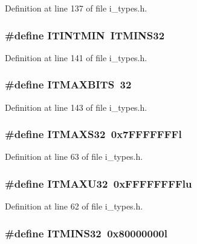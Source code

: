 Definition at line 137 of file i\_\-types.h.
\subsubsection{\setlength{\rightskip}{0pt plus 5cm}\#define ITINTMIN~ITMINS32}\label{i__types_8h_8384a255d15820283e96b29546745132}




Definition at line 141 of file i\_\-types.h.
\subsubsection{\setlength{\rightskip}{0pt plus 5cm}\#define ITMAXBITS~32}\label{i__types_8h_5c38a3fb099d71b2b107ad3506a72603}




Definition at line 143 of file i\_\-types.h.
\subsubsection{\setlength{\rightskip}{0pt plus 5cm}\#define ITMAXS32~0x7FFFFFFFl}\label{i__types_8h_9c3fa27cf9e11fa00e0fbe4ab707eaf2}




Definition at line 63 of file i\_\-types.h.
\subsubsection{\setlength{\rightskip}{0pt plus 5cm}\#define ITMAXU32~0x\-FFFFFFFFlu}\label{i__types_8h_b448f16e60e814d22410a731a1d85384}




Definition at line 62 of file i\_\-types.h.
\subsubsection{\setlength{\rightskip}{0pt plus 5cm}\#define ITMINS32~0x80000000l}\label{i__types_8h_c79e45a1fb3d13db987816c92efca307}




